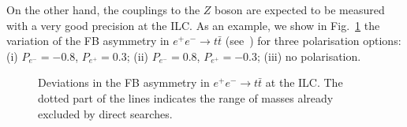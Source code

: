 \documentclass[12pt,a4paper]{article}
\begin{document}
On the other hand, the couplings to the $Z$ boson are expected to be measured with a very good precision at the ILC. As an example, we show in Fig.~\ref{fig:ILC} the variation of the FB asymmetry in $e^+ e^- \to t \bar t$ (see~\cite{AguilarSaavedra:2012vh}) for three polarisation options: (i) $P_{e^-} = -0.8$, $P_{e^+} = 0.3$;  (ii) $P_{e^-} = 0.8$, $P_{e^+} = -0.3$; (iii) no polarisation.
%
\begin{figure}[htb]
\begin{center}
\caption{Deviations in the FB asymmetry in $e^+ e^- \to t \bar t$ at the ILC. The dotted part of the lines indicates the range of masses already excluded by direct searches.}
\label{fig:ILC}
\end{center}
\end{figure}
\end{document}
